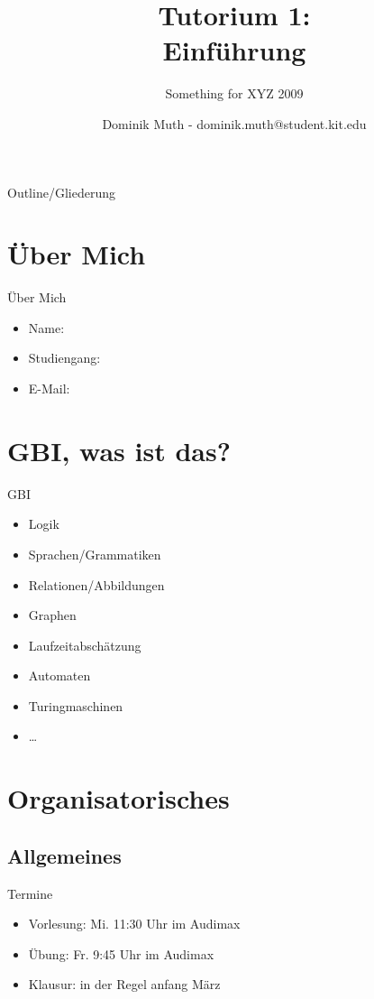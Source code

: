\documentclass[18pt]{beamer}
\title[Einf\"uhrung]{Tutorium 1:\\ Einf\"uhrung}
\subtitle{Something for XYZ 2009}
\author{Dominik Muth - dominik.muth@student.kit.edu}
\institute{Institut f\"ur Informatik}
\begin{document}

\begin{frame}
\titlepage
\end{frame}

\begin{frame}{Outline/Gliederung}
\tableofcontents
\end{frame}

\section{\"Uber Mich}
\begin{frame}{\"Uber Mich}
\begin{itemize}
\item Name: \cite{Dominik Muth} %
\item Studiengang: \cite{Informatik} %
\item E-Mail: \cite{dominik.muth@student.kit.edu} %
\end{itemize}
\end{frame}

\section{GBI, was ist das?}
\begin{frame}{GBI}
\begin{itemize}
\item Logik
\pause
\item Sprachen/Grammatiken
\pause
\item Relationen/Abbildungen
\pause
\item Graphen
\pause
\item Laufzeitabsch\"atzung
\pause
\item Automaten
\pause
\item Turingmaschinen
\item \dots
\end{itemize}
\end{frame}


\section{Organisatorisches}
\subsection{Allgemeines}
\begin{frame}{Termine}
\begin{itemize}
\item Vorlesung: Mi. 11:30 Uhr im Audimax
\item \"Ubung: Fr. 9:45 Uhr im Audimax
\item Klausur: in der Regel anfang M\"arz
\end{itemize}
\end{frame}
\end{document}
